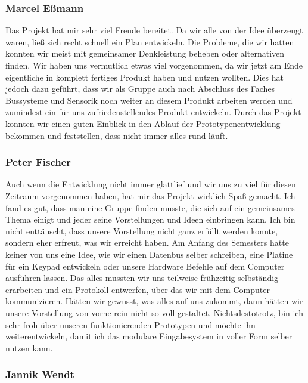 \subsubsection{Marcel Eßmann}
Das Projekt hat mir sehr viel Freude bereitet. Da wir alle von der Idee überzeugt waren, ließ sich recht schnell ein Plan entwickeln. Die Probleme, die wir hatten konnten wir meist mit gemeinsamer Denkleistung beheben oder alternativen finden.
Wir haben uns vermutlich etwas viel vorgenommen, da wir jetzt am Ende eigentliche in komplett fertiges Produkt haben und nutzen wollten. Dies hat jedoch dazu geführt, dass wir als Gruppe auch nach Abschluss des Faches \glqq Bussysteme und Sensorik\grqq{} noch weiter an diesem Produkt arbeiten werden und zumindest ein für uns zufriedenstellendes Produkt entwickeln. 
Durch das Projekt konnten wir einen guten Einblick in den Ablauf der Prototypenentwicklung bekommen und feststellen, dass nicht immer alles rund läuft.

\subsubsection{Peter Fischer}
Auch wenn die Entwicklung nicht immer glattlief und wir uns zu viel für diesen Zeitraum vorgenommen haben, hat mir das Projekt wirklich Spaß gemacht. Ich fand es gut, dass man eine Gruppe finden musste, die sich auf ein gemeinsames Thema einigt und jeder seine Vorstellungen und Ideen einbringen kann. Ich bin nicht enttäuscht, dass unsere Vorstellung nicht ganz erfüllt werden konnte, sondern eher erfreut, was wir erreicht haben. Am Anfang des Semesters hatte keiner von uns eine Idee, wie wir einen Datenbus selber schreiben, eine Platine für ein Keypad entwickeln oder unsere Hardware Befehle auf dem Computer ausführen lassen. Das alles mussten wir uns teilweise frühzeitig selbständig erarbeiten und ein Protokoll entwerfen, über das wir mit dem Computer kommunizieren. Hätten wir gewusst, was alles auf uns zukommt, dann hätten wir unsere Vorstellung von vorne rein nicht so voll gestaltet. Nichtsdestotrotz, bin ich sehr froh über unseren funktionierenden Prototypen und möchte ihn weiterentwickeln, damit ich das \glqq modulare Eingabesystem\grqq{} in voller Form selber nutzen kann.

\subsubsection{Jannik Wendt}